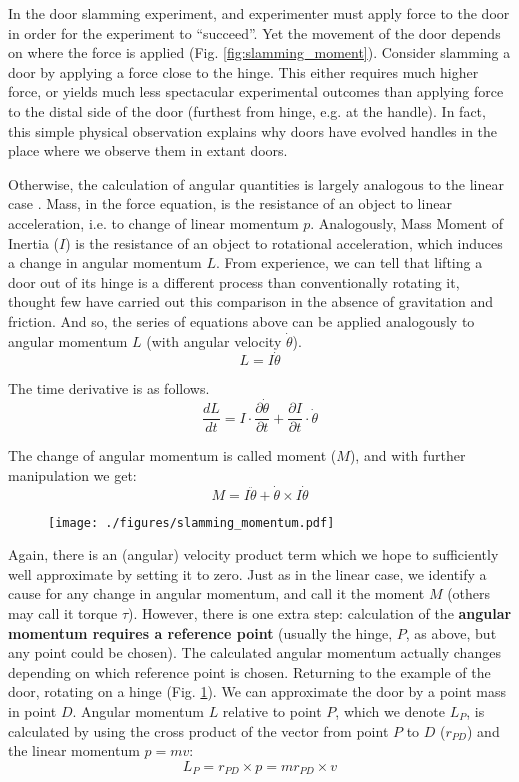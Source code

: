 \documentclass[10pt,a4paper]{article}
\begin{document}
In the door slamming experiment, and experimenter must apply force to the door in order for the experiment to ``succeed''.
Yet the movement of the door depends on where the force is applied (Fig. \ref{fig:slamming_moment}).
Consider slamming a door by applying a force close to the hinge.
This either requires much higher force, or yields much less spectacular experimental outcomes than applying force to the distal side of the door (furthest from hinge, e.g. at the handle).
In fact, this simple physical observation explains why doors have evolved handles in the place where we observe them in extant doors.


Otherwise, the calculation of angular quantities is largely analogous to the linear case \citep{Lewin801L20,Tipler2007}.
Mass, in the force equation, is the resistance of an object to linear acceleration, i.e. to change of linear momentum \(p\).
Analogously, Mass Moment of Inertia (\(I\)) is the resistance of an object to rotational acceleration, which induces a change in angular momentum \(L\).
From experience, we can tell that lifting a door out of its hinge is a different process than conventionally rotating it, thought few have carried out this comparison in the absence of gravitation and friction.
And so, the series of equations above can be applied analogously to angular momentum \(L\) (with angular velocity \(\dot \theta\)).
\[L = I \dot \theta\]

The time derivative is as follows.
\[\frac{dL}{dt} = I \cdot \frac{\partial \dot \theta}{\partial t} + \frac{\partial I}{\partial t} \cdot \dot \theta\]

The change of angular momentum is called moment (\(M\)), and with further manipulation \citep{Widnall2009} we get:
\begin{equation}\label{eqn:moment}
M = I \ddot\theta + \dot\theta \times I\dot\theta
\end{equation}


\begin{figure}[htbp]
\centering
\texttt{[image: ./figures/slamming\_momentum.pdf]}
\label{fig:slamming_momentum}
\end{figure}

Again, there is an (angular) velocity product term which we hope to sufficiently well approximate by setting it to zero.
Just as in the linear case, we identify a cause for any change in angular momentum, and call it the moment \(M\) (others may call it torque \(\tau\)).
However, there is one extra step: calculation of the \textbf{angular momentum requires a reference point} (usually the hinge, \(P\), as above, but any point could be chosen).
The calculated angular momentum actually changes depending on which reference point is chosen.
Returning to the example of the door, rotating on a hinge (Fig. \ref{fig:slamming_momentum}).
We can approximate the door by a point mass in point \(D\).
Angular momentum \(L\) relative to point \(P\), which we denote \(L_P\), is calculated by using the cross product of the vector from point \(P\) to \(D\) (\(r_{PD}\)) and the linear momentum \(p=mv\):
\[L_{P} = r_{PD} \times p = m r_{PD} \times v \]
\end{document}
